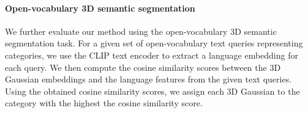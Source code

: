 \paragraph{Open-vocabulary 3D semantic segmentation}
We further evaluate our method using the open-vocabulary 3D semantic segmentation task. For a given set of open-vocabulary text queries representing categories, we use the CLIP text encoder to extract a language embedding for each query. We then compute the cosine similarity scores between the 3D Gaussian embeddings and the language features from the given text queries. Using the obtained cosine similarity scores, we assign each 3D Gaussian to the category with the highest the cosine similarity score.